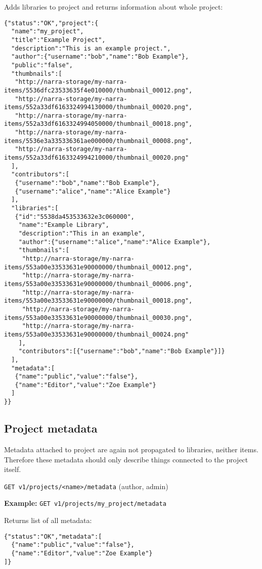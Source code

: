 \documentclass{book}
\newcommand{\request}[2]{{\color{blue}\texttt{#1} (#2)}}
\newcommand{\reqexample}[1]{{\color{blue}\textbf{Example:} \texttt{#1}}}
\begin{document}
Adds libraries to project and returns information about whole project:

\begin{verbatim}
{"status":"OK","project":{
  "name":"my_project",
  "title":"Example Project",
  "description":"This is an example project.",
  "author":{"username":"bob","name":"Bob Example"},
  "public":"false",
  "thumbnails":[
   "http://narra-storage/my-narra-items/5536dfc23533635f4e010000/thumbnail_00012.png",
   "http://narra-storage/my-narra-items/552a33df6163324994130000/thumbnail_00020.png",
   "http://narra-storage/my-narra-items/552a33df6163324994050000/thumbnail_00018.png",
   "http://narra-storage/my-narra-items/5536e3a335336361ae000000/thumbnail_00008.png",
   "http://narra-storage/my-narra-items/552a33df6163324994210000/thumbnail_00020.png"
  ],
  "contributors":[
   {"username":"bob","name":"Bob Example"},
   {"username":"alice","name":"Alice Example"}
  ],
  "libraries":[
   {"id":"5538da453533632e3c060000",
    "name":"Example Library",
    "description":"This in an example",
    "author":{"username":"alice","name":"Alice Example"},
    "thumbnails":[
     "http://narra-storage/my-narra-items/553a00e33533631e90000000/thumbnail_00012.png",
     "http://narra-storage/my-narra-items/553a00e33533631e90000000/thumbnail_00006.png",
     "http://narra-storage/my-narra-items/553a00e33533631e90000000/thumbnail_00018.png",
     "http://narra-storage/my-narra-items/553a00e33533631e90000000/thumbnail_00030.png",
     "http://narra-storage/my-narra-items/553a00e33533631e90000000/thumbnail_00024.png"
    ],
    "contributors":[{"username":"bob","name":"Bob Example"}]}
  ],
  "metadata":[
   {"name":"public","value":"false"},
   {"name":"Editor","value":"Zoe Example"}
  ]
}}
\end{verbatim}


\subsection{Project metadata}
Metadata attached to project are again not propagated to libraries, neither items. Therefore these metadata should only describe things connected to the project itself.

\request{GET v1/projects/<name>/metadata}{author, admin}

\reqexample{GET v1/projects/my\_project/metadata}

Returns list of all metadata:

\begin{verbatim}
{"status":"OK","metadata":[
  {"name":"public","value":"false"},
  {"name":"Editor","value":"Zoe Example"}
]}
\end{verbatim}
\end{document}
